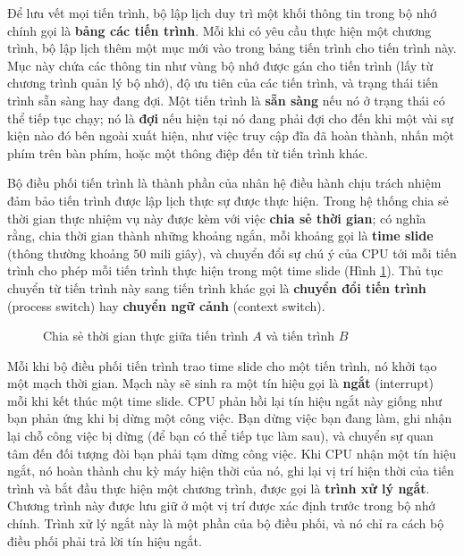 Để lưu vết mọi tiến trình, bộ lập lịch duy trì một khối thông tin trong bộ nhớ chính gọi
là \textbf{bảng các tiến trình}. Mỗi khi có yêu cầu thực hiện một chương trình, bộ lập
lịch thêm một mục mới vào trong bảng tiến trình cho tiến trình này. Mục này chứa các thông
tin như vùng bộ nhớ được gán cho tiến trình (lấy từ chương trình quản lý bộ nhớ), độ ưu
tiên của các tiến trình, và trạng thái tiến trình sẵn sàng hay đang đợi. Một tiến trình là
\textbf{sẵn sàng} nếu nó ở trạng thái có thể tiếp tục chạy; nó là \textbf{đợi} nếu hiện
tại nó đang phải đợi cho đến khi một vài sự kiện nào đó bên ngoài xuất hiện, như việc truy
cập đĩa đã hoàn thành, nhấn một phím trên bàn phím, hoặc một thông điệp đến từ tiến trình
khác.



Bộ điều phối tiến trình là thành phần của nhân hệ điều hành chịu trách nhiệm đảm bảo tiến
trình được lập lịch thực sự được thực hiện. Trong hệ thống chia sẻ thời gian thực nhiệm vụ
này được kèm với việc \textbf{chia sẻ thời gian}; có nghĩa rằng, chia thời gian thành
những khoảng ngắn, mỗi khoảng gọi là \textbf{time slide} (thông thường khoảng $50$ mili
giây), và chuyển đổi sự chú ý của CPU tới mỗi tiến trình cho phép mỗi tiến trình thực hiện
trong một time slide (Hình \ref{fig:fig3.6}). Thủ tục chuyển từ tiến trình này sang tiến
trình khác gọi là \textbf{chuyển đổi tiến trình} (process switch) hay \textbf{chuyển ngữ
  cảnh} (context switch).

\begin{figure}[bt]
  \centering {}
  \caption{Chia sẻ thời gian thực giữa tiến trình $A$ và tiến trình $B$}
  \label{fig:fig3.6}
\end{figure}


Mỗi khi bộ điều phối tiến trình trao time slide cho một tiến trình, nó khởi tạo một mạch
thời gian. Mạch này sẽ sinh ra một tín hiệu gọi là \textbf{ngắt} (interrupt) mỗi khi kết
thúc một time slide. CPU phản hồi lại tín hiệu ngắt này giống như bạn phản ứng khi bị dừng
một công việc. Bạn dừng việc bạn đang làm, ghi nhận lại chỗ công việc bị dừng (để bạn có
thể tiếp tục làm sau), và chuyển sự quan tâm đến đối tượng đòi bạn phải tạm dừng công
việc. Khi CPU nhận một tín hiệu ngắt, nó hoàn thành chu kỳ máy hiện thời của nó, ghi lại
vị trí hiện thời của tiến trình và bắt đầu thực hiện một chương trình, được gọi là
\textbf{trình xử lý ngắt}. Chương trình này được lưu giữ ở một vị trí được xác định trước
trong bộ nhớ chính. Trình xử lý ngắt này là một phần của bộ điều phối, và nó chỉ ra cách
bộ điều phối phải trả lời tín hiệu ngắt.

